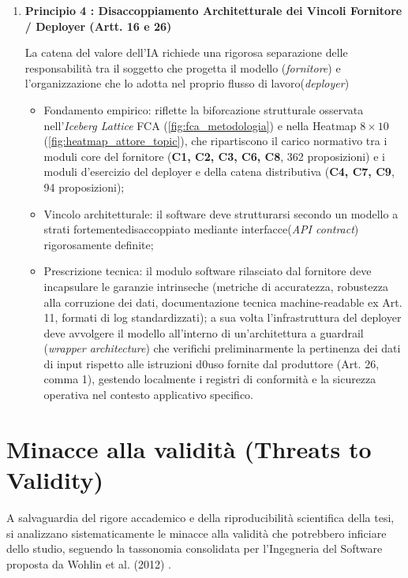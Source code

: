 \documentclass[12pt,a4paper,oneside]{report}
\begin{document}
\begin{enumerate}
    \item \textbf{Principio 4 : Disaccoppiamento Architetturale dei Vincoli Fornitore / Deployer (Artt. 16 e 26)}

    La catena del valore dell'IA richiede una rigorosa separazione delle responsabilità tra il soggetto che progetta il modello (\textit{fornitore}) e l'organizzazione che lo adotta nel proprio flusso di lavoro(\textit{deployer})
    \begin{itemize}
        \item Fondamento empirico:  riflette la biforcazione strutturale osservata nell'\emph{Iceberg Lattice} FCA (\cref{fig:fca_metodologia}) e nella Heatmap $8 \times 10$ (\cref{fig:heatmap_attore_topic}), che ripartiscono il carico normativo tra i moduli core del fornitore (\textbf{C1, C2, C3, C6, C8}, 362 proposizioni) e i moduli d'esercizio del deployer e della catena distributiva (\textbf{C4, C7, C9}, 94 proposizioni);
        \item Vincolo architetturale: il software deve strutturarsi secondo un modello a strati fortementedisaccoppiato mediante interfacce(\textit{API contract}) rigorosamente definite;
        \item Prescrizione tecnica: il modulo software rilasciato dal fornitore deve incapsulare le garanzie intrinseche (metriche di accuratezza, robustezza alla corruzione dei dati, documentazione tecnica machine-readable ex Art. 11, formati di log standardizzati); a sua volta l'infrastruttura del deployer deve avvolgere il modello all'interno di un'architettura a guardrail (\emph{wrapper architecture}) che verifichi preliminarmente la pertinenza dei dati di input rispetto alle istruzioni d0uso fornite dal produttore (Art. 26, comma 1), gestendo localmente i registri di conformità e la sicurezza operativa nel contesto applicativo specifico.
    \end{itemize}
\end{enumerate}

%

\section{Minacce alla validità (Threats to Validity)}
A salvaguardia del rigore accademico e della riproducibilità scientifica della tesi, si analizzano sistematicamente le minacce alla validità che potrebbero inficiare dello studio, seguendo la tassonomia consolidata per l'Ingegneria del Software proposta da Wohlin et al. (2012) \cite{wohlin2012experimentation}.
\end{document}
